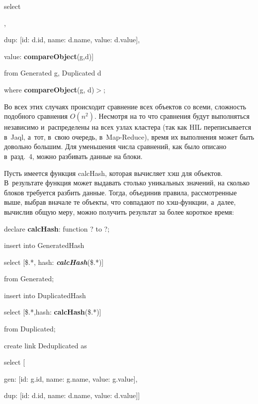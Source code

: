 \begin{multicols}{2}
{\noindent
  select

\noindent
  [gen: [id: g.id, name: g.name, value: g.value],

\noindent
  dup: [id: d.id, name: d.name, value: d.value],

\noindent
  value: {\textbf{compareObject}}(g,d)]

\noindent
  from Generated g, Duplicated d

\noindent
  where {\textbf{compareObject}}(g, d)\;$>$;
  }

  Во всех этих случаях происходит сравнение всех объектов со всеми, сложность подобного
сравнения $O(n^2)$. Несмотря на то что сравнения будут выполняться независимо
и~распределены на всех узлах кластера (так как HIL переписывается в~Jaql, а~тот, в~свою
очередь, в~Map-Reduce), время их выполнения может быть довольно большим. Для
уменьшения числа сравнений, как было описано в~разд.~4, можно разбивать
данные на блоки.

  Пусть имеется функция {\sf calcHash}, которая вычисляет хэш для объектов. В~результате
функция может выдавать столько уникальных значений, на сколько блоков требуется
разбить данные. Тогда, объединив правила, рассмотренные выше, выбрав вначале те
объекты, что совпадают по хэш-функ\-ции, а~далее, вычислив общую меру, можно получить
результат за более короткое время:

{\sf

\noindent
  declare {\textbf{calcHash}}: function ? to ?;

\noindent
  insert into GeneratedHash

\noindent
  select [\$.*, hash: {\bfseries\textit{calcHash}}(\$.*)]

\noindent
  from Generated;

\noindent
  insert into DuplicatedHash

\noindent
  select [\$.*,hash: {\textbf{calcHash}}(\$.*)]

\noindent
  from Duplicated;

 \vspace*{6pt}

\noindent
  create link Deduplicated as

\noindent
  select [

\noindent
  \hspace*{3pt}gen: [id: g.id, name: g.name, value:   g.value],

\noindent
  \hspace*{3pt}dup: [id: d.id, name: d.name, value: d.value]]

}
\end{multicols}
